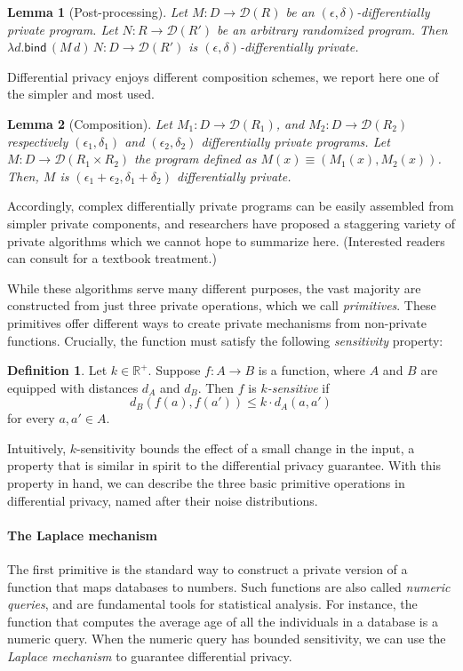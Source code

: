 \documentclass{sig-alternate-05-2015}
\theoremstyle{plain}
\newtheorem{lemma}{Lemma}[section]
\theoremstyle{definition}
\newtheorem{definition}{Definition}[section]
\theoremstyle{corollary}
\def\R{\mathbb{R}}
\newcommand{\rplus}{\R^+}
\newcommand{\distr}{\mathcal{D}}
\begin{document}
\begin{lemma}[Post-processing]
Let $M:D\rightarrow\distr(R)$ be an  $(\epsilon, \delta)$-differentially private program. Let $N:R\rightarrow \distr(R')$ be an
arbitrary randomized program. Then $\lambda d. \mathsf{bind}\, (M\, d)\, N:D\rightarrow\distr(R')$ is $(\epsilon,\delta)$-differentially private.
\end{lemma}
Differential privacy enjoys different composition schemes, we report
here one of the simpler and most used. 
\begin{lemma}[Composition]
Let $M_1:D\rightarrow\distr(R_1)$, and  $M_2:D\rightarrow\distr(R_2)$
respectively $(\epsilon_1,\delta_1)$ and $(\epsilon_2,\delta_2)$
differentially private programs. Let $M:D\rightarrow \distr(R_1\times
R_2)$ the program defined as $M(x)\equiv (M_1(x),M_2(x))$. Then, $M$ is $(\epsilon_1+\epsilon_2,\delta_1+\delta_2)$ differentially private.
\end{lemma}
Accordingly, complex differentially private programs can be easily
assembled from simpler private components, and researchers have proposed a
staggering variety of private algorithms which we cannot hope to summarize here.
(Interested readers can consult \citet{DBLP:journals/fttcs/DworkR14} for a
textbook treatment.)

While these algorithms serve many different purposes, the vast majority are
constructed from just three private operations, which we call \emph{primitives}.
These primitives offer different ways to create private mechanisms from
non-private functions. Crucially, the function must satisfy the following
\emph{sensitivity} property:
\begin{definition}
  Let $k \in \rplus$. Suppose $f : A \to B$ is a function, where $A$ and $B$
  are equipped with distances $d_A$ and $d_B$. Then $f$ is \emph{$k$-sensitive}
  if
  \[
  d_B(f(a), f(a')) \leq k \cdot d_A(a, a')
  \]
  for every $a, a' \in A$.
\end{definition}
Intuitively, $k$-sensitivity bounds the effect of a small change in the input, a
property that is similar in spirit to the differential privacy guarantee.
With this property in hand, we can describe the three basic primitive operations
in differential privacy, named after their noise distributions.

\paragraph*{The Laplace mechanism}
The first primitive is the standard way to construct a private version of a
function that maps databases to numbers. Such functions are also called
\emph{numeric queries}, and are fundamental tools for statistical analysis. For
instance, the function that computes the average age of all the individuals in a
database is a numeric query. When the numeric query has bounded sensitivity, we
can use the \emph{Laplace mechanism} to guarantee differential privacy.
\end{document}
